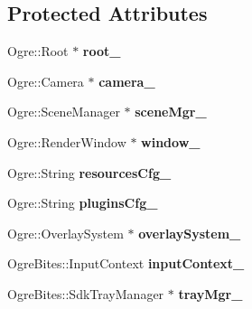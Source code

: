 \subsection*{Protected Attributes}
\begin{DoxyCompactItemize}
\item 
Ogre\+::\+Root $\ast$ {\bfseries root\+\_\+}\hypertarget{class_base_fight_window_ad76765f7b8b51f9f584c4ada4279808b}{}\label{class_base_fight_window_ad76765f7b8b51f9f584c4ada4279808b}

\item 
Ogre\+::\+Camera $\ast$ {\bfseries camera\+\_\+}\hypertarget{class_base_fight_window_a0b398664f8ac632c5107c5ba35d7fc97}{}\label{class_base_fight_window_a0b398664f8ac632c5107c5ba35d7fc97}

\item 
Ogre\+::\+Scene\+Manager $\ast$ {\bfseries scene\+Mgr\+\_\+}\hypertarget{class_base_fight_window_ae5eda4f47c54341e9d023ac87f9608af}{}\label{class_base_fight_window_ae5eda4f47c54341e9d023ac87f9608af}

\item 
Ogre\+::\+Render\+Window $\ast$ {\bfseries window\+\_\+}\hypertarget{class_base_fight_window_a5533716d44d2b41cb50a48a3f27d9522}{}\label{class_base_fight_window_a5533716d44d2b41cb50a48a3f27d9522}

\item 
Ogre\+::\+String {\bfseries resources\+Cfg\+\_\+}\hypertarget{class_base_fight_window_aa333f3cf1175838eb8ddc7e1129e3976}{}\label{class_base_fight_window_aa333f3cf1175838eb8ddc7e1129e3976}

\item 
Ogre\+::\+String {\bfseries plugins\+Cfg\+\_\+}\hypertarget{class_base_fight_window_a174e31ec4a3ee61369e3239c103bd26e}{}\label{class_base_fight_window_a174e31ec4a3ee61369e3239c103bd26e}

\item 
Ogre\+::\+Overlay\+System $\ast$ {\bfseries overlay\+System\+\_\+}\hypertarget{class_base_fight_window_a08f88603b4c77bc5286d29a9f06efc5d}{}\label{class_base_fight_window_a08f88603b4c77bc5286d29a9f06efc5d}

\item 
Ogre\+Bites\+::\+Input\+Context {\bfseries input\+Context\+\_\+}\hypertarget{class_base_fight_window_a85a4950c0419360b5f999eba346e1994}{}\label{class_base_fight_window_a85a4950c0419360b5f999eba346e1994}

\item 
Ogre\+Bites\+::\+Sdk\+Tray\+Manager $\ast$ {\bfseries tray\+Mgr\+\_\+}\hypertarget{class_base_fight_window_a2acae6d460945acfdcacbe506731d58b}{}\label{class_base_fight_window_a2acae6d460945acfdcacbe506731d58b}


\end{DoxyCompactItemize}
